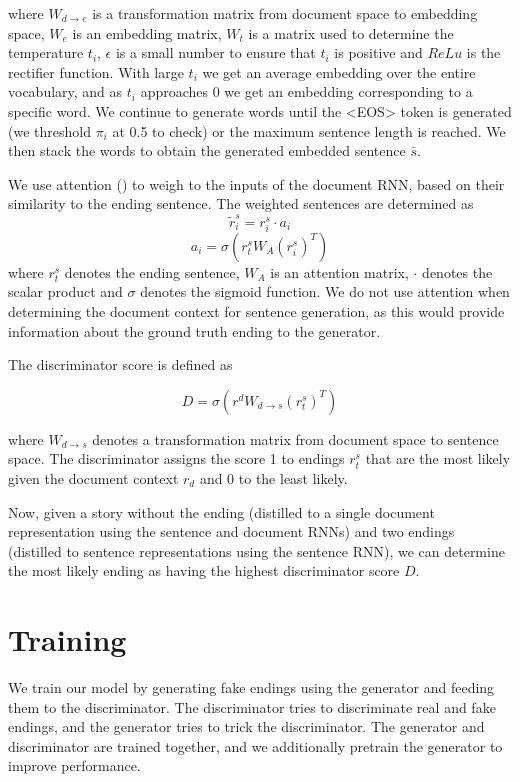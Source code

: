 \documentclass{article}
\begin{document}
where $W_{d \rightarrow e}$ is a transformation matrix from document space to embedding space, $W_{e}$ is an embedding matrix, $W_{t}$ is a matrix used to determine the temperature $t_{i}$, $\epsilon$ is a small number to ensure that $t_{i}$ is positive and $ReLu$ is the rectifier function. With large $t_{i}$ we get an average embedding over the entire vocabulary, and as $t_{i}$ approaches 0 we get an embedding corresponding to a specific word. We continue to generate words until the <EOS> token is generated (we threshold $\pi_{i}$ at 0.5 to check) or the maximum sentence length is reached. We then stack the words to obtain the generated embedded sentence $\bar{s}$.

We use attention (\cite{P16-1122}) to weigh to the inputs of the document RNN, based on their similarity to the ending sentence. The weighted sentences are determined as
$$ \tilde{r}^{s}_{i} = r^{s}_{i} \cdot a_{i} $$
$$ a_{i} = \sigma(r^{s}_{t}W_{A}(r^{s}_{i})^{T}) $$
where $r^{s}_{t}$ denotes the ending sentence, $W_{A}$ is an attention matrix, $\cdot$ denotes the scalar product and $\sigma$ denotes the sigmoid function. We do not use attention when determining the document context for sentence generation, as this would provide information about the ground truth ending to the generator.

The discriminator score is defined as 

$$ D = \sigma(r^{d}W_{d \rightarrow s}(r^{s}_{t})^{T} )$$

where $W_{d \rightarrow s}$ denotes a transformation matrix from document space to sentence space. The discriminator assigns the score 1 to endings $r^{s}_{t}$ that are the most likely given the document context $r_{d}$ and 0 to the least likely.

Now, given a story without the ending (distilled to a single document representation using the sentence and document RNNs) and two endings (distilled to sentence representations using the sentence RNN), we can determine the most likely ending as having the highest discriminator score $D$. 
\section{Training}
We train our model by generating fake endings using the generator and feeding them to the discriminator. The discriminator tries to discriminate real and fake endings, and the generator tries to trick the discriminator. The generator and discriminator are trained together, and we additionally pretrain the generator to improve performance.
\end{document}
